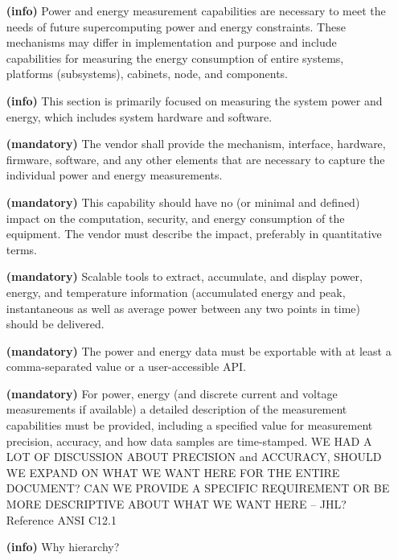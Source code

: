 \begin{itemize}
\item[{\textbf{(info)}}]
Power and energy measurement capabilities are necessary to meet the needs of future 
supercomputing power and energy constraints. These mechanisms may differ in implementation 
and purpose and include capabilities for measuring the energy consumption of entire systems, 
platforms (subsystems), cabinets, node, and components.  

\item[{\textbf{(info)}}]
This section is primarily focused on measuring the system power and energy, 
which includes system hardware and software.  

\item[{\textbf{(mandatory)}}]
The vendor shall provide the mechanism, interface, hardware, firmware, software, 
and any other elements that are necessary to capture the individual power and energy measurements. 

\item[{\textbf{(mandatory)}}]
This capability should have no (or minimal and defined) impact on the computation, 
security, and energy consumption of the equipment.  The vendor must describe 
the impact, preferably in quantitative terms.  

\item[{\textbf{(mandatory)}}]
Scalable tools to extract, accumulate, and display power, energy, and temperature 
information (accumulated energy and peak, instantaneous as well as average power 
between any two points in time) should be delivered.

\item[{\textbf{(mandatory)}}]
The power and energy data must be exportable with at least a comma-separated value or 
a user-accessible API. 

\item[{\textbf{(mandatory)}}]
For power, energy (and discrete current and voltage measurements if available) a 
detailed description of the measurement capabilities must be provided, 
including a specified value for measurement precision, accuracy, and how data 
samples are time-stamped. 
WE HAD A LOT OF DISCUSSION ABOUT PRECISION and ACCURACY, 
SHOULD WE EXPAND ON WHAT WE WANT HERE FOR THE ENTIRE DOCUMENT? 
CAN WE PROVIDE A SPECIFIC REQUIREMENT OR BE MORE DESCRIPTIVE ABOUT 
WHAT WE WANT HERE – JHL? Reference ANSI C12.1

\item[{\textbf{(info)}}]
Why hierarchy?


\end{itemize}
